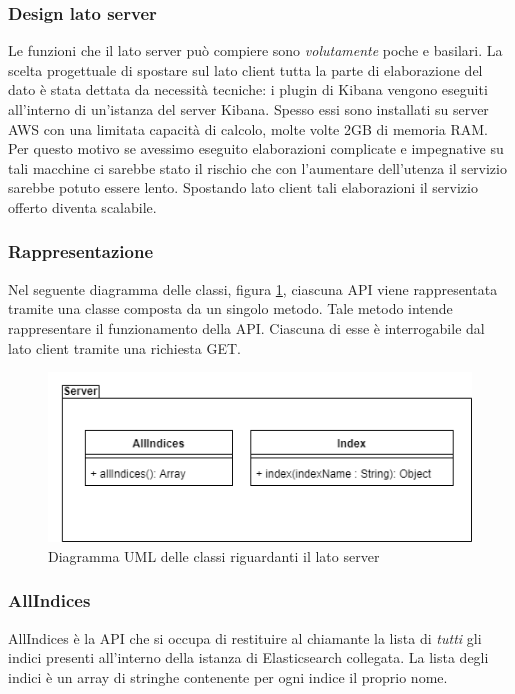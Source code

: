 \subsubsection{Design lato server}
Le funzioni che il lato server può compiere sono \emph{volutamente}  poche e basilari. La scelta progettuale di spostare sul lato client tutta la parte di elaborazione del dato è stata dettata da necessità tecniche: i plugin di Kibana vengono eseguiti all'interno di un'istanza del server Kibana. Spesso essi sono installati su server AWS con una limitata capacità di calcolo, molte volte 2GB di memoria RAM. Per questo motivo se avessimo eseguito elaborazioni complicate e impegnative su tali macchine ci sarebbe stato il rischio che con l'aumentare dell'utenza il servizio sarebbe potuto essere lento. Spostando lato client tali elaborazioni il servizio offerto diventa scalabile.

\subsubsection{Rappresentazione}
Nel seguente diagramma delle classi, figura \ref{img:diagrammaClassiServer}, ciascuna API viene rappresentata tramite una classe composta da un singolo metodo. Tale metodo intende rappresentare il funzionamento della API. Ciascuna di esse è interrogabile dal lato client tramite una richiesta GET.


\begin{figure}[H]
	\centering
	\includegraphics[width=1\textwidth]{Images/DiagrammaClassiServer.png}
	\caption{Diagramma UML delle classi riguardanti il lato server}
	\label{img:diagrammaClassiServer}
\end{figure}

\subsubsection{AllIndices}
AllIndices è la API che si occupa di restituire al chiamante la lista di \emph{tutti} gli indici presenti all'interno della istanza di Elasticsearch collegata. La lista degli indici è un array di stringhe contenente per ogni indice il proprio nome.

